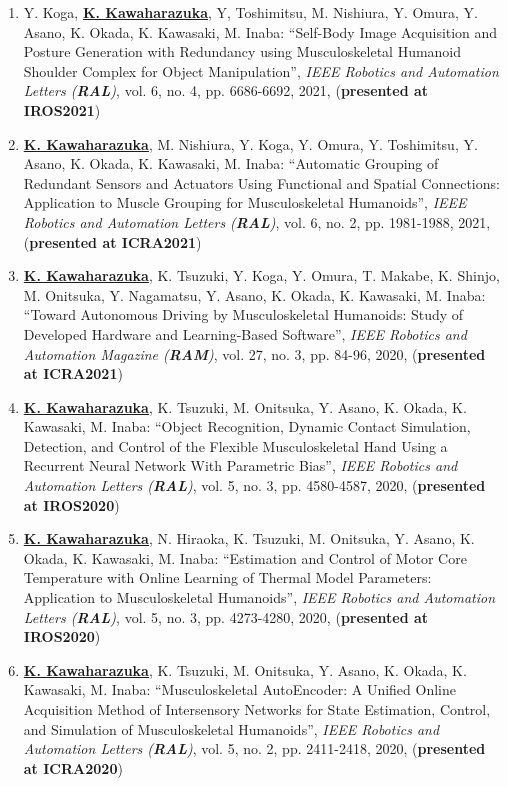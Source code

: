 \documentclass[letterpaper,11pt]{article}
\begin{document}
\begin{enumerate}
\item Y. Koga, \underline{\textbf{K. Kawaharazuka}}, Y, Toshimitsu, M. Nishiura, Y. Omura, Y. Asano, K. Okada, K. Kawasaki, M. Inaba: ``Self-Body Image Acquisition and Posture Generation with Redundancy using Musculoskeletal Humanoid Shoulder Complex for Object Manipulation'', \textit{IEEE Robotics and Automation Letters (\textit{\textbf{RAL}})}, vol. 6, no. 4, pp. 6686-6692, 2021, (\textbf{presented at IROS2021})
\item \underline{\textbf{K. Kawaharazuka}}, M. Nishiura, Y. Koga, Y. Omura, Y. Toshimitsu, Y. Asano, K. Okada, K. Kawasaki, M. Inaba: ``Automatic Grouping of Redundant Sensors and Actuators Using Functional and Spatial Connections: Application to Muscle Grouping for Musculoskeletal Humanoids'', \textit{IEEE Robotics and Automation Letters (\textit{\textbf{RAL}})}, vol. 6, no. 2, pp. 1981-1988, 2021, (\textbf{presented at ICRA2021})
\item \underline{\textbf{K. Kawaharazuka}}, K. Tsuzuki, Y. Koga, Y. Omura, T. Makabe, K. Shinjo, M. Onitsuka, Y. Nagamatsu, Y. Asano, K. Okada, K. Kawasaki, M. Inaba: ``Toward Autonomous Driving by Musculoskeletal Humanoids: Study of Developed Hardware and Learning-Based Software'', \textit{IEEE Robotics and Automation Magazine (\textit{\textbf{RAM}})}, vol. 27, no. 3, pp. 84-96, 2020, (\textbf{presented at ICRA2021})
\item \underline{\textbf{K. Kawaharazuka}}, K. Tsuzuki, M. Onitsuka, Y. Asano, K. Okada, K. Kawasaki, M. Inaba: ``Object Recognition, Dynamic Contact Simulation, Detection, and Control of the Flexible Musculoskeletal Hand Using a Recurrent Neural Network With Parametric Bias'', \textit{IEEE Robotics and Automation Letters (\textit{\textbf{RAL}})}, vol. 5, no. 3, pp. 4580-4587, 2020, (\textbf{presented at IROS2020})
\item \underline{\textbf{K. Kawaharazuka}}, N. Hiraoka, K. Tsuzuki, M. Onitsuka, Y. Asano, K. Okada, K. Kawasaki, M. Inaba: ``Estimation and Control of Motor Core Temperature with Online Learning of Thermal Model Parameters: Application to Musculoskeletal Humanoids'', \textit{IEEE Robotics and Automation Letters (\textit{\textbf{RAL}})}, vol. 5, no. 3, pp. 4273-4280, 2020, (\textbf{presented at IROS2020})
\item \underline{\textbf{K. Kawaharazuka}}, K. Tsuzuki, M. Onitsuka, Y. Asano, K. Okada, K. Kawasaki, M. Inaba: ``Musculoskeletal AutoEncoder: A Unified Online Acquisition Method of Intersensory Networks for State Estimation, Control, and Simulation of Musculoskeletal Humanoids'', \textit{IEEE Robotics and Automation Letters (\textit{\textbf{RAL}})}, vol. 5, no. 2, pp. 2411-2418, 2020, (\textbf{presented at ICRA2020})

\end{enumerate}
\end{document}
